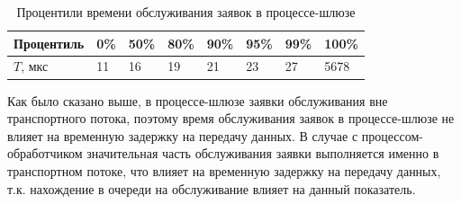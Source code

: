 \begin{table}[!h]
\caption{Процентили времени обслуживания заявок в процессе-шлюзе}\label{chapter41:TableTR}
\centering
\begin{tabular}{|l|l|l|l|l|l|l|l|}
\hline
Процентиль & 0\% & 50\% & 80\% & 90\% & 95\% & 99\% & 100\% \\ \hline
$T$, мкс & 11 & 16 & 19 & 21 & 23 & 27 & 5678 \\ \hline
\end{tabular}
\end{table}

Как было сказано выше, в процессе-шлюзе заявки обслуживания вне транспортного потока, поэтому время обслуживания заявок в процессе-шлюзе не влияет на временную задержку на передачу данных. В случае с процессом-обработчиком значительная часть обслуживания заявки выполняется именно в транспортном потоке, что влияет на временную задержку на передачу данных, т.к. нахождение в очереди на обслуживание влияет на данный показатель.
